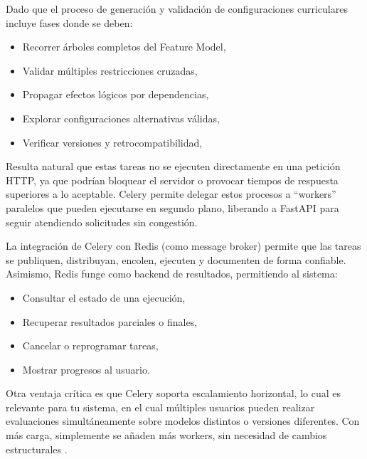 {{        Dado que el proceso de generación y validación de configuraciones curriculares 
        incluye fases donde se deben:
        \begin{itemize}
            \item Recorrer árboles completos del Feature Model,
            
            \item Validar múltiples restricciones cruzadas,
            
            \item Propagar efectos lógicos por dependencias,
            
            \item Explorar configuraciones alternativas válidas,
            
            \item Verificar versiones y retrocompatibilidad,
        \end{itemize}

        Resulta natural que estas tareas no se ejecuten directamente en una petición HTTP, 
        ya que podrían bloquear el servidor o provocar tiempos de respuesta superiores 
        a lo aceptable. Celery permite delegar estos procesos a “workers” paralelos 
        que pueden ejecutarse en segundo plano, liberando a FastAPI para seguir 
        atendiendo solicitudes sin congestión.

        La integración de Celery con Redis (como message broker) permite que las tareas 
        se publiquen, distribuyan, encolen, ejecuten y documenten de forma confiable. 
        Asimismo, Redis funge como backend de resultados, permitiendo al sistema:
        \begin{itemize}
            \item Consultar el estado de una ejecución,
            
            \item Recuperar resultados parciales o finales,
            
            \item Cancelar o reprogramar tareas,
            
            \item Mostrar progresos al usuario.
        \end{itemize}

        Otra ventaja crítica es que Celery soporta escalamiento horizontal, lo cual es 
        relevante para tu sistema, en el cual múltiples usuarios pueden realizar 
        evaluaciones simultáneamente sobre modelos distintos o versiones diferentes. 
        Con más carga, simplemente se añaden más workers, sin necesidad de cambios 
        estructurales \citep{celery2024docs}.

}}

